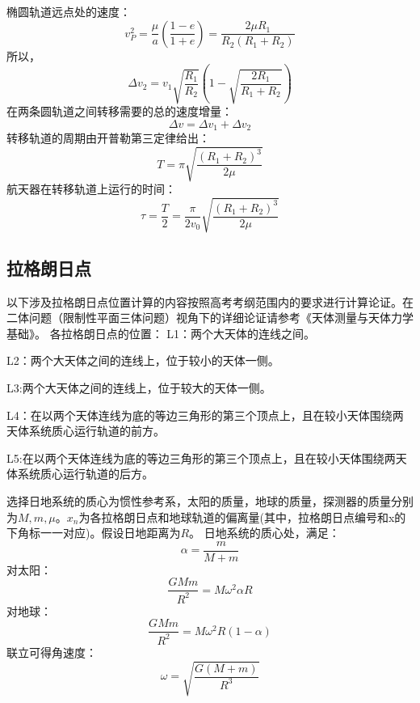 椭圆轨道远点处的速度：
\begin{equation}
	v_{P}^2=\frac{\mu}{a}\left(\frac{1-e}{1+e}\right)=\frac{2\mu R_{1}}{R_{2}(R_{1}+R_{2})}
\end{equation}
所以，
\begin{equation}
	\Delta v_{2}=v_{1}\sqrt{\frac{R_{1}}{R_{2}}}\left(1-\sqrt{\frac{2R_{1}}{R_{1}+R_{2}}}\right)
\end{equation}
在两条圆轨道之间转移需要的总的速度增量：
\begin{equation}
	\Delta v =\Delta v_{1}+\Delta v_{2}
\end{equation}
转移轨道的周期由开普勒第三定律给出：
\begin{equation}
	T=\pi\sqrt{\frac{(R_{1}+R_{2})^3}{2\mu}}
\end{equation}
航天器在转移轨道上运行的时间：
\begin{equation}
	\tau =\frac{T}{2}=\frac{\pi}{2v_{0}}\sqrt{\frac{(R_{1}+R_{2})^3}{2\mu}}
\end{equation}
\subsection{拉格朗日点}
以下涉及拉格朗日点位置计算的内容按照高考考纲范围内的要求进行计算论证。在二体问题（限制性平面三体问题）视角下的详细论证请参考《天体测量与天体力学基础》。
各拉格朗日点的位置：
L1：两个大天体的连线之间。

L2：两个大天体之间的连线上，位于较小的天体一侧。

L3:两个大天体之间的连线上，位于较大的天体一侧。

L4：在以两个天体连线为底的等边三角形的第三个顶点上，且在较小天体围绕两天体系统质心运行轨道的前方。

L5:在以两个天体连线为底的等边三角形的第三个顶点上，且在较小天体围绕两天体系统质心运行轨道的后方。


选择日地系统的质心为惯性参考系，太阳的质量，地球的质量，探测器的质量分别为$M,m,\mu$。$x_{n}$为各拉格朗日点和地球轨道的偏离量(其中，拉格朗日点编号和x的下角标一一对应)。假设日地距离为$R$。
日地系统的质心处，满足：
\begin{equation}
	\alpha =\frac{m}{M+m}
\end{equation}
对太阳：
\begin{equation}
	\frac{GMm}{R^2}=M\omega^2\alpha R
\end{equation}
对地球：
\begin{equation}
	\frac{GMm}{R^2}=M\omega ^2R(1-\alpha)
\end{equation}
联立可得角速度：
\begin{equation}
	\omega =\sqrt{\frac{G(M+m)}{R^3}}
\end{equation}
